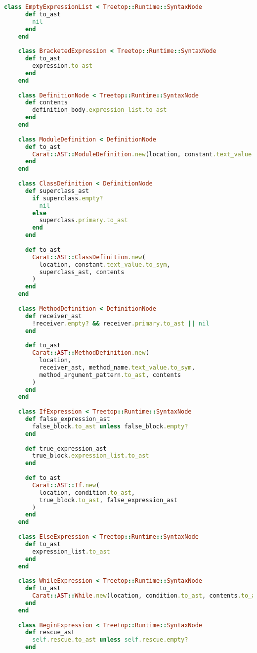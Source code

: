 \begin{lstlisting}[title={\small\ttfamily\bfseries parser/nodes.rb},language=Ruby]
    class EmptyExpressionList < Treetop::Runtime::SyntaxNode
      def to_ast
        nil
      end
    end
    
    class BracketedExpression < Treetop::Runtime::SyntaxNode
      def to_ast
        expression.to_ast
      end
    end
    
    class DefinitionNode < Treetop::Runtime::SyntaxNode
      def contents
        definition_body.expression_list.to_ast
      end
    end
    
    class ModuleDefinition < DefinitionNode
      def to_ast
        Carat::AST::ModuleDefinition.new(location, constant.text_value.to_sym, contents)
      end
    end
    
    class ClassDefinition < DefinitionNode
      def superclass_ast
        if superclass.empty?
          nil
        else
          superclass.primary.to_ast
        end
      end
      
      def to_ast
        Carat::AST::ClassDefinition.new(
          location, constant.text_value.to_sym,
          superclass_ast, contents
        )
      end
    end
    
    class MethodDefinition < DefinitionNode
      def receiver_ast
        !receiver.empty? && receiver.primary.to_ast || nil
      end
      
      def to_ast
        Carat::AST::MethodDefinition.new(
          location,
          receiver_ast, method_name.text_value.to_sym,
          method_argument_pattern.to_ast, contents
        )
      end
    end
    
    class IfExpression < Treetop::Runtime::SyntaxNode
      def false_expression_ast
        false_block.to_ast unless false_block.empty?
      end
      
      def true_expression_ast
        true_block.expression_list.to_ast
      end
    
      def to_ast
        Carat::AST::If.new(
          location, condition.to_ast,
          true_block.to_ast, false_expression_ast
        )
      end
    end
    
    class ElseExpression < Treetop::Runtime::SyntaxNode
      def to_ast
        expression_list.to_ast
      end
    end
    
    class WhileExpression < Treetop::Runtime::SyntaxNode
      def to_ast
        Carat::AST::While.new(location, condition.to_ast, contents.to_ast)
      end
    end
    
    class BeginExpression < Treetop::Runtime::SyntaxNode
      def rescue_ast
        self.rescue.to_ast unless self.rescue.empty?
      end
    

\end{lstlisting}
